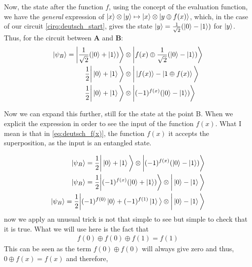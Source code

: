 Now, the state after the function $f$, using the concept of the evaluation function, we have the \textit{general} expression of $\ket{x} \otimes \ket{y} \mapsto \ket{x}\otimes \ket{y \oplus f(x)}$, 
which, in the case of our circuit \autoref{cirq:deutsch_start}, gives the state $\ket{y}=\frac{1}{\sqrt{2}}(\ket{0} - \ket{1}) $ for $\ket{y}$.
Thus, for the circuit between \textbf{A} and \textbf{B}:
\begin{align}
\ket{\psi_B}=\bigg| \frac{1}{\sqrt{2}} (\ket{0}+\ket{1}) \bigg \rangle  &\otimes \bigg| f(x) \oplus \frac{1}{\sqrt{2}} (\ket{0}-\ket{1}) \bigg \rangle \\
\frac{1}{2} \bigg| \ket{0}+\ket{1} \bigg \rangle  &\otimes \bigg| \ket{f(x)}-\ket{1\oplus f(x)} \bigg \rangle \\
\frac{1}{2} \bigg| \ket{0}+\ket{1} \bigg \rangle  &\otimes \bigg| (-1)^{f(x)} (\ket{0}-\ket{1}) \bigg \rangle
\label{eq:deutsch_f(x)}
\end{align}

Now we can expand this further, still for the state at the point B. When we explicit the expression 
in order to see the input of the function $f(x)$. What I mean is that in \autoref{eq:deutsch_f(x)}, the function 
$f(x)$ it accepts the superposition, as the input is an entangled state.

\begin{align}
\ket{\psi_B} = \frac{1}{2} \bigg| \ket{0}+\ket{1} \bigg \rangle  \otimes \bigg| (-1)^{f(x)} (\ket{0}-\ket{1}) \bigg \rangle \\
\ket{\psi_B} = \frac{1}{2} \bigg| (-1)^{f(x)}(\ket{0}+\ket{1})\bigg \rangle \otimes \bigg| \ket{0}-\ket{1} \bigg \rangle \\
\ket{\psi_B} = \frac{1}{2} \bigg| (-1)^{f(0)}\ket{0} + (-1)^{f(1)}\ket{1} \big \rangle \otimes \bigg| \ket{0} - \ket{1} \bigg \rangle
\end{align}
now we apply an unusual trick is not that simple to see but simple to check that it is true. What we will use here is the fact that 
\begin{align}
  f(0)\oplus f(0) \oplus f(1) = f(1)
\end{align}
This can be seen as the term $f(0) \oplus f(0)$ will always give zero and thus, $0 \oplus f(x)=f(x)$ and therefore, 

